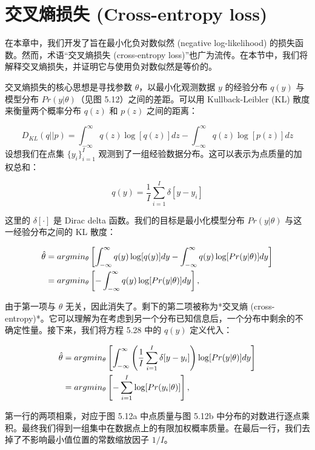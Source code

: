 \section{交叉熵损失 (Cross-entropy loss)}

在本章中，我们开发了旨在最小化负对数似然 (negative log-likelihood) 的损失函数。然而，术语“交叉熵损失 (cross-entropy loss)”也广为流传。在本节中，我们将解释交叉熵损失，并证明它与使用负对数似然是等价的。

交叉熵损失的核心思想是寻找参数 \(\theta\)，以最小化观测数据 \(y\) 的经验分布 \(q(y)\) 与模型分布 \(Pr(y|\theta)\)（见图 5.12）之间的差距。可以用 Kullback-Leibler (KL) 散度来衡量两个概率分布 \(q(z)\) 和 \(p(z)\) 之间的距离：

\begin{equation}
D_{KL}(q||p) = \int_{-\infty}^{\infty} q(z) \log [q(z)] dz - \int_{-\infty}^{\infty} q(z) \log [p(z)] dz 
\end{equation}
设想我们在点集 \(\{y_i\}^I_{i=1}\) 观测到了一组经验数据分布。这可以表示为点质量的加权总和：

\begin{equation}
q(y) = \frac{1}{I} \sum_{i=1}^{I} \delta[y - y_i] 
\end{equation}

这里的 \(\delta[\cdot]\) 是 Dirac delta 函数。我们的目标是最小化模型分布 \(Pr(y|\theta)\) 与这一经验分布之间的 KL 散度：


\begin{align}
	\hat{\theta} &= argmin_{\theta} \left[ \int_{-\infty}^{\infty} q(y) \log [q(y)] dy - \int_{-\infty}^{\infty} q(y) \log [Pr(y|\theta)] dy \right] \notag \\
	&= argmin_{\theta} \left[ -\int_{-\infty}^{\infty} q(y) \log [Pr(y|\theta)] dy \right], 
\end{align}


由于第一项与 \(\theta\) 无关，因此消失了。剩下的第二项被称为*交叉熵 (cross-entropy)*。它可以理解为在考虑到另一个分布已知信息后，一个分布中剩余的不确定性量。接下来，我们将方程 5.28 中的 \(q(y)\) 定义代入：


\begin{align}
	\hat{\theta} &= argmin_{\theta} \left[ \int_{-\infty}^{\infty} \left( \frac{1}{I} \sum_{i=1}^{I} \delta[y - y_i] \right) \log [Pr(y|\theta)] dy \right] \notag \\
	&= argmin_{\theta} \left[ -\sum_{i=1}^{I} \log [Pr(y_i|\theta)] \right], 
\end{align} 


第一行的两项相乘，对应于图 5.12a 中点质量与图 5.12b 中分布的对数进行逐点乘积。最终我们得到一组集中在数据点上的有限加权概率质量。在最后一行，我们去掉了不影响最小值位置的常数缩放因子 \(1/I\)。


